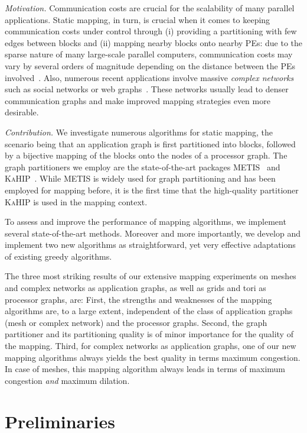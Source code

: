 \documentclass[pdftex]{llncs}
\newcommand{\metis}{\textsc{METIS}\xspace}
\newcommand{\kahip}{\textsc{KaHIP}\xspace}
\begin{document}
\noindent \emph{Motivation.} Communication costs are crucial for the
scalability of many parallel applications. Static mapping, in turn, is
crucial when it comes to keeping communication costs under control
through (i) providing a partitioning with few edges between blocks and
(ii) mapping nearby blocks onto nearby PEs: due to the sparse nature
of many large-scale parallel computers,
communication costs may vary by several orders of magnitude depending
on the distance between the PEs
involved~\cite{Teresco2000269}. Also, numerous recent applications involve
massive \emph{complex networks} such as social networks or web graphs~\cite{costa2011analyzing}. These
networks usually lead to denser communication graphs and make improved
mapping strategies even more desirable.

\noindent \emph{Contribution.}
We investigate numerous algorithms for static mapping,
the scenario being that an application graph is first partitioned into
blocks, followed by a bijective mapping of the blocks onto the nodes
of a processor graph. The graph partitioners we employ are the
state-of-the-art packages \metis~\cite{Karypis13a} and
\kahip~\cite{Sanders2013a}. While \metis is widely used for graph
partitioning and has been employed for mapping before, it is the first
time that the high-quality partitioner \kahip is used in the mapping
context.

To assess and improve the performance of mapping algorithms, we
implement several state-of-the-art methods. Moreover and more
importantly, we develop and implement two new algorithms as
straightforward, yet very effective adaptations of existing greedy
algorithms.

The three most striking results of our extensive mapping experiments
on meshes and complex networks as application graphs, as well as grids
and tori as processor graphs, are: First, the strengths
and weaknesses of the mapping algorithms are, to a large extent,
independent of the class of application graphs (mesh or complex
network) and the processor graphs. Second, the graph partitioner and
its partitioning quality is of minor importance for the quality
of the mapping. Third, for complex networks as application graphs,
one of our new mapping algorithms always yields the best quality in terms 
maximum congestion. In case of meshes, this mapping algorithm always 
leads in terms of maximum congestion \emph{and} maximum dilation.

\section{Preliminaries}
\label{sec:prelim}
\end{document}
